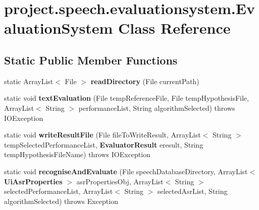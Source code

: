 \section{project.\+speech.\+evaluationsystem.\+Evaluation\+System Class Reference}
\label{classproject_1_1speech_1_1evaluationsystem_1_1_evaluation_system}
\subsection*{Static Public Member Functions}
\begin{DoxyCompactItemize}
\item 
static Array\+List$<$ File $>$ {\bf read\+Directory} (File current\+Path)
\item 
static void {\bf text\+Evaluation} (File temp\+Reference\+File, File temp\+Hypothesis\+File, Array\+List$<$ String $>$ performance\+List, String algorithm\+Selected)  throws I\+O\+Exception 
\item 
static void {\bf write\+Result\+File} (File file\+To\+Write\+Result, Array\+List$<$ String $>$ temp\+Selected\+Performance\+List, {\bf Evaluator\+Result} eresult, String temp\+Hypothesis\+File\+Name)  throws I\+O\+Exception
\item 
static void {\bf recognise\+And\+Evaluate} (File speech\+Database\+Directory, Array\+List$<$ {\bf Ui\+Asr\+Properties} $>$ asr\+Properties\+Obj, Array\+List$<$ String $>$ selected\+Performance\+List, Array\+List$<$ String $>$ selected\+Asr\+List, String algorithm\+Selected)  throws Exception 
\end{DoxyCompactItemize}
